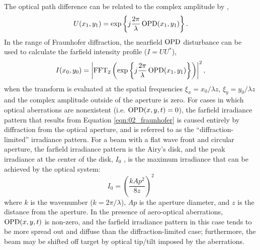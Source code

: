 The optical path difference can be related to the complex amplitude by \cite{Cicchiello-1997-RHxhNMxj},
\begin{equation}
  U(x_1,y_1) = \exp\left\{j\frac{2\pi}{\lambda}\operatorname{OPD}(x_1,y_1)\right\} \textrm{.}
\end{equation}
In the range of Fraunhofer diffraction, the nearfield $\operatorname{OPD}$ disturbance can be used to calculate the farfield intensity profile ($I = UU^*$),
\begin{equation}
  I(x_0,y_0) = \left|\operatorname{FFT_2}\left(\exp\left\{j\frac{2\pi}{\lambda}\operatorname{OPD}(x_1,y_1)\right\}\right)\right|^2 \textrm{,}
\end{equation}
when the transform is evaluated at the spatial frequencies $\xi_x = x_0/\lambda z$, $\xi_y = y_0/\lambda z$ and the complex amplitude outside of the aperture is zero.
For cases in which optical aberrations are nonexistent (i.e. $\operatorname{OPD}(x,y,t)=0$), the farfield irradiance pattern that results from Equation \ref{eqn:02_fraunhofer} is caused entirely by diffraction from the optical aperture, and is referred to as the ``diffraction-limited'' irradiance pattern.
For a beam with a flat wave front and circular aperture, the farfield irradiance pattern is the Airy’s disk, and the peak irradiance at the center of the disk, $I_0$ , is the maximum irradiance that can be achieved by the optical system:
\begin{equation}
  I_0 = \left(\frac{kAp^2}{8z}\right)^2
  \label{eqn:02_airy_pattern}
\end{equation}
where $k$ is the wavenumber ($k=2\pi /\lambda$), $Ap$ is the aperture diameter, and $z$ is the distance from the aperture.
In the presence of aero-optical aberrations, $\operatorname{OPD}(x,y,t)$ is non-zero, and the farfield irradiance pattern in this case tends to be more spread out and diffuse than the diffraction-limited case; furthermore, the beam may be shifted off target by optical tip/tilt imposed by the aberrations.

